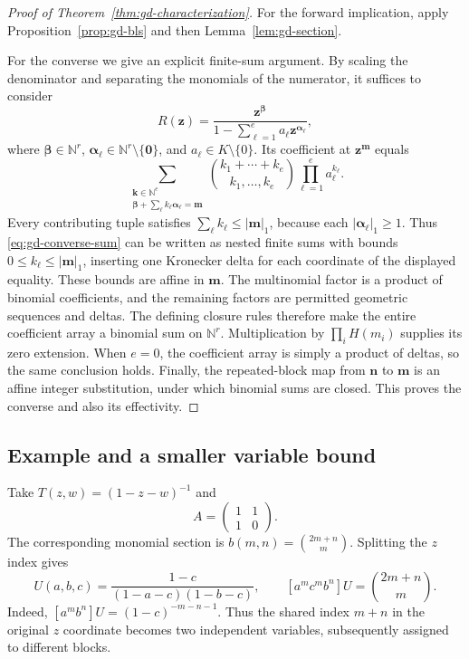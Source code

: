 \documentclass[11pt,a4paper]{article}
\theoremstyle{remark}\newtheorem{remark}[theorem]{Remark}
\begin{document}
\begin{proof}[Proof of Theorem~\ref{thm:gd-characterization}]
For the forward implication, apply Proposition~\ref{prop:gd-bls} and
then Lemma~\ref{lem:gd-section}.

For the converse we give an explicit finite-sum argument.  By scaling
the denominator and separating the monomials of the numerator, it
suffices to consider
\begin{equation}
 R(\boldsymbol z)=
 \frac{\boldsymbol z^{\boldsymbol\beta}}
 {1-\sum_{\ell=1}^e a_\ell
                    \boldsymbol z^{\boldsymbol\alpha_\ell}},
 \label{eq:gd-converse-rational}
\end{equation}
where $\boldsymbol\beta\in\mathbb N^r$,
$\boldsymbol\alpha_\ell\in\mathbb N^r\setminus\{\boldsymbol0\}$,
and $a_\ell\in K\setminus\{0\}$.
Its coefficient at $\boldsymbol z^{\boldsymbol m}$ equals
\begin{equation}
 \sum_{\substack{\boldsymbol k\in\mathbb N^e\\
 \boldsymbol\beta+\sum_\ell k_\ell\boldsymbol\alpha_\ell
                         =\boldsymbol m}}
 \binom{k_1+\cdots+k_e}{k_1,\ldots,k_e}
 \prod_{\ell=1}^e a_\ell^{k_\ell}.
 \label{eq:gd-converse-sum}
\end{equation}
Every contributing tuple satisfies
$\sum_\ell k_\ell\le |\boldsymbol m|_1$, because each
$|\boldsymbol\alpha_\ell|_1\ge1$.
Thus \eqref{eq:gd-converse-sum} can be written as nested finite sums
with bounds $0\le k_\ell\le|\boldsymbol m|_1$, inserting one
Kronecker delta for each coordinate of the displayed equality.
These bounds are affine in $\boldsymbol m$.  The multinomial factor is
a product of binomial coefficients, and the remaining factors are
permitted geometric sequences and deltas.  The defining closure rules
therefore make the entire coefficient array a binomial sum on
$\mathbb N^r$.  Multiplication by $\prod_i H(m_i)$ supplies its zero
extension.  When $e=0$, the coefficient array is simply a product of
deltas, so the same conclusion holds.  Finally, the repeated-block
map from $\boldsymbol n$ to $\boldsymbol m$ is an affine integer
substitution, under which binomial sums are closed.
This proves the converse and also its effectivity.
\end{proof}

\subsection{Example and a smaller variable bound}

Take $T(z,w)=(1-z-w)^{-1}$ and
\[
 A=\begin{pmatrix}1&1\\1&0\end{pmatrix}.
\]
The corresponding monomial section is
$b(m,n)=\binom{2m+n}{m}$.  Splitting the $z$ index gives
\begin{equation}
 U(a,b,c)=\frac{1-c}{(1-a-c)(1-b-c)},\qquad
 [a^mc^mb^n]U=\binom{2m+n}{m}.
 \label{eq:gd-example}
\end{equation}
Indeed, $[a^mb^n]U=(1-c)^{-m-n-1}$.  Thus the shared index $m+n$
in the original $z$ coordinate becomes two independent variables,
subsequently assigned to different blocks.
\end{document}
